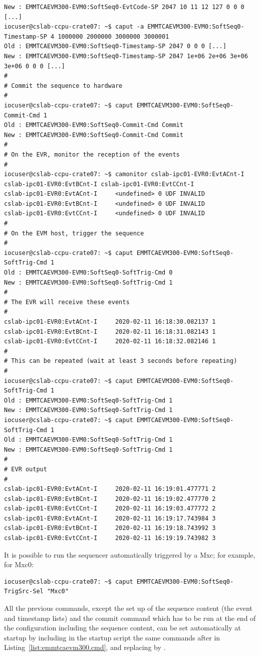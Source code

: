 \documentclass[11pt
  , a4paper
  , article
  , oneside
  , showtrims
]{memoir}
\begin{document}
\begin{lstlisting}[style=termstyle]
New : EMMTCAEVM300-EVM0:SoftSeq0-EvtCode-SP 2047 10 11 12 127 0 0 0 [...]
iocuser@cslab-ccpu-crate07: ~$ caput -a EMMTCAEVM300-EVM0:SoftSeq0-Timestamp-SP 4 1000000 2000000 3000000 3000001
Old : EMMTCAEVM300-EVM0:SoftSeq0-Timestamp-SP 2047 0 0 0 [...]
New : EMMTCAEVM300-EVM0:SoftSeq0-Timestamp-SP 2047 1e+06 2e+06 3e+06 3e+06 0 0 0 [...]
#
# Commit the sequence to hardware
#
iocuser@cslab-ccpu-crate07: ~$ caput EMMTCAEVM300-EVM0:SoftSeq0-Commit-Cmd 1
Old : EMMTCAEVM300-EVM0:SoftSeq0-Commit-Cmd Commit
New : EMMTCAEVM300-EVM0:SoftSeq0-Commit-Cmd Commit
#
# On the EVR, monitor the reception of the events
#
iocuser@cslab-ccpu-crate07: ~$ camonitor cslab-ipc01-EVR0:EvtACnt-I cslab-ipc01-EVR0:EvtBCnt-I cslab-ipc01-EVR0:EvtCCnt-I
cslab-ipc01-EVR0:EvtACnt-I     <undefined> 0 UDF INVALID
cslab-ipc01-EVR0:EvtBCnt-I     <undefined> 0 UDF INVALID
cslab-ipc01-EVR0:EvtCCnt-I     <undefined> 0 UDF INVALID
#
# On the EVM host, trigger the sequence
#
iocuser@cslab-ccpu-crate07: ~$ caput EMMTCAEVM300-EVM0:SoftSeq0-SoftTrig-Cmd 1
Old : EMMTCAEVM300-EVM0:SoftSeq0-SoftTrig-Cmd 0
New : EMMTCAEVM300-EVM0:SoftSeq0-SoftTrig-Cmd 1
#
# The EVR will receive these events
#
cslab-ipc01-EVR0:EvtACnt-I     2020-02-11 16:18:30.082137 1
cslab-ipc01-EVR0:EvtBCnt-I     2020-02-11 16:18:31.082143 1
cslab-ipc01-EVR0:EvtCCnt-I     2020-02-11 16:18:32.082146 1
#
# This can be repeated (wait at least 3 seconds before repeating)
#
iocuser@cslab-ccpu-crate07: ~$ caput EMMTCAEVM300-EVM0:SoftSeq0-SoftTrig-Cmd 1
Old : EMMTCAEVM300-EVM0:SoftSeq0-SoftTrig-Cmd 1
New : EMMTCAEVM300-EVM0:SoftSeq0-SoftTrig-Cmd 1
iocuser@cslab-ccpu-crate07: ~$ caput EMMTCAEVM300-EVM0:SoftSeq0-SoftTrig-Cmd 1
Old : EMMTCAEVM300-EVM0:SoftSeq0-SoftTrig-Cmd 1
New : EMMTCAEVM300-EVM0:SoftSeq0-SoftTrig-Cmd 1
#
# EVR output
#
cslab-ipc01-EVR0:EvtACnt-I     2020-02-11 16:19:01.477771 2
cslab-ipc01-EVR0:EvtBCnt-I     2020-02-11 16:19:02.477770 2
cslab-ipc01-EVR0:EvtCCnt-I     2020-02-11 16:19:03.477772 2
cslab-ipc01-EVR0:EvtACnt-I     2020-02-11 16:19:17.743984 3
cslab-ipc01-EVR0:EvtBCnt-I     2020-02-11 16:19:18.743992 3
cslab-ipc01-EVR0:EvtCCnt-I     2020-02-11 16:19:19.743982 3
\end{lstlisting}

It is possible to run the sequencer automatically triggered by a Mxc; for example, for Mxc0:
\begin{lstlisting}
iocuser@cslab-ccpu-crate07: ~$ caput EMMTCAEVM300-EVM0:SoftSeq0-TrigSrc-Sel "Mxc0"
\end{lstlisting}

All the previous commands, except the set up of the sequence content (the event and timestamp lists) and the commit command which has to be run at the end of the configuration including the sequence content, can be set automatically at startup by including in the startup script the same commands after  in Listing~\ref{list:emmtcaevm300.cmd}, and replacing  by .\\
\end{document}
